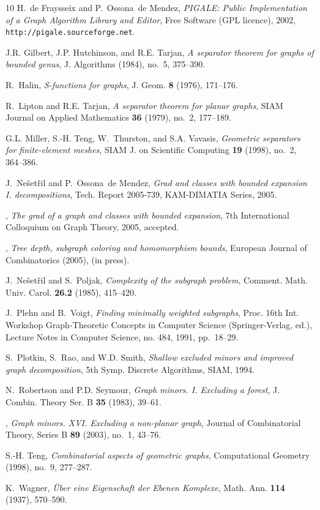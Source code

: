 \documentclass[a4paper]{amsart}
\theoremstyle{definition}
\theoremstyle{remark}
\begin{document}
\begin{thebibliography}{10}
H.~de Fraysseix and P.~Ossona~de Mendez, \emph{{PIGALE}: {P}ublic
  {I}mplementation of a {G}raph {A}lgorithm {L}ibrary and {E}ditor}, Free
  Software (GPL licence), 2002, {\tt http://pigale.sourceforge.net}.


J.R. Gilbert, J.P. Hutchinson, and R.E. Tarjan, \emph{A separator theorem for
  graphs of bounded genus}, J. Algorithms (1984), no.~5, 375--390.

R.~Halin, \emph{S-functions for graphs}, J. Geom. \textbf{8} (1976), 171--176.

R.~Lipton and R.E. Tarjan, \emph{A separator theorem for planar graphs}, SIAM
  Journal on Applied Mathematics \textbf{36} (1979), no.~2, 177--189.

G.L. Miller, S.-H. Teng, W.~Thurston, and S.A. Vavasis, \emph{Geometric
  separators for finite-element meshes}, SIAM J. on Scientific Computing
  \textbf{19} (1998), no.~2, 364--386.

J.~Ne{\v s}et{\v r}il and P.~Ossona~de Mendez, \emph{Grad and classes with
  bounded expansion {I}. decompositions}, Tech. Report 2005-739,
  {K}{A}{M}-{D}{I}{M}{A}{T}{I}{A} {S}eries, 2005.

\bysame, \emph{The grad of a graph and classes with bounded expansion}, 7th
  International Colloquium on Graph Theory, 2005, accepted.

\bysame, \emph{Tree depth, subgraph coloring and homomorphism bounds}, European
  Journal of Combinatorics (2005), (in press).

J.~Ne{\v s}et{\v r}il and S.~Poljak, \emph{Complexity of the subgraph problem},
  Comment. Math. Univ. Carol. \textbf{26.2} (1985), 415--420.

J.~Plehn and B.~Voigt, \emph{Finding minimally weighted subgraphs}, Proc. 16th
  Int. Workshop Graph-Theoretic Concepts in Computer Science (Springer-Verlag,
  ed.), Lecture Notes in Computer Science, no. 484, 1991, pp.~18--29.

S.~Plotkin, S.~Rao, and W.D. Smith, \emph{Shallow excluded minors and improved
  graph decomposition}, 5th Symp. Discrete Algorithms, SIAM, 1994.

N.~Robertson and P.D. Seymour, \emph{Graph minors. {I}. {E}xcluding a forest},
  J. Combin. Theory Ser. B \textbf{35} (1983), 39--61.

\bysame, \emph{Graph minors. {XVI}. {E}xcluding a non-planar graph}, Journal of
  Combinatorial Theory, Series B \textbf{89} (2003), no.~1, 43--76.

S.-H. Teng, \emph{Combinatorial aspects of geometric graphs}, Computational
  Geometry (1998), no.~9, 277--287.

K.~Wagner, \emph{{\"U}ber eine {E}igenschaft der {E}benen {K}omplexe}, Math.
  Ann. \textbf{114} (1937), 570--590.

\end{thebibliography}
\end{document}
